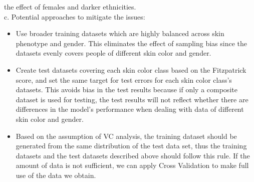 \documentclass{article}
\begin{document}
    the effect of females and darker ethnicities.\\
    c. Potential approaches to mitigate the issues:
    \begin{itemize}
        \item Use broader training datasets which are highly balanced across skin phenotype and gender. This 
        eliminates the effect of sampling bias since the datasets evenly covers people of different skin color 
        and gender.
        \item Create test datasets covering each skin color class based on the Fitzpatrick score, and set the 
        same target for test errors for each skin color class's datasets. This avoids bias in the test results
        because if only a composite dataset is used for testing, the test results will not reflect whether there 
        are differences in the model's performance when dealing with data of different skin color and gender.
        \item Based on the assumption of VC analysis, the training dataset should be generated from the same 
        distribution of the test data set, thus the training datasets and the test datasets described above 
        should follow this rule. If the amount of data is not sufficient, we can apply Cross Validation to make 
        full use of the data we obtain.
    \end{itemize}
\end{document}
